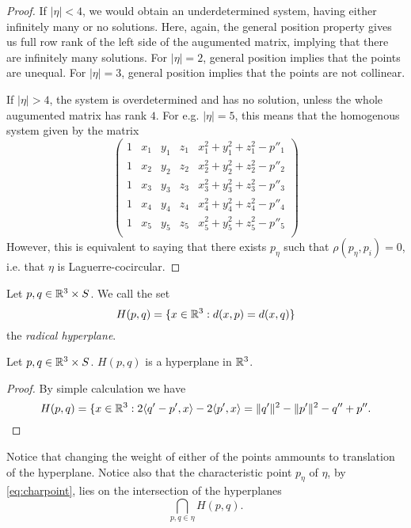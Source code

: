 \begin{proof}
	If $|\eta|<4$, we would obtain an underdetermined system, having either infinitely many or no solutions.  Here, again, the general position property gives us full row rank of the left side of the augumented matrix, implying that there are infinitely many solutions. For $|\eta|=2$, general position implies that the points are unequal. For $|\eta| =3$, general position implies that the points are not collinear.


	If $|\eta|>4$, the system is overdetermined and has no solution, unless the whole augumented matrix has rank $4$. For e.g. $|\eta|=5$, this means that the homogenous system given by the matrix 
	$$
	\begin{pmatrix}\label{circmat}
		1 & x_1 & y_1 & z_1 & x_1^2 + y_1^2 + z_1^2 - p''_1  \\
		1 & x_2 & y_2 & z_2 & x_2^2 + y_2^2 + z_2^2 - p''_2  \\
		1 & x_3 & y_3 & z_3 & x_3^2 + y_3^2 + z_3^2 - p''_3  \\
		1 & x_4 & y_4 & z_4 & x_4^2 + y_4^2 + z_4^2 - p''_4  \\
		1 & x_5 & y_5 & z_5 & x_5^2 + y_5^2 + z_5^2 - p''_5  \\
	\end{pmatrix}
	$$
	However, this is equivalent to saying that there exists $p_\eta$ such that $\rho(p_\eta,p_i)=0$, i.e. that $\eta$ is Laguerre-cocircular.
\end{proof}

\begin{definition} Let $p,q \in {\mathbb R^3}\times S$. We call the set 
	$$H(p,q) = \{ x\in {\mathbb R^3}: d(x,p) = d(x,q) \}$$
	the \textit{radical hyperplane}.
\end{definition}

\begin{proposition} Let $p,q \in {\mathbb R^3}\times S$. $H(p,q)$ is a hyperplane in ${\mathbb R^3}$.
\end{proposition}
\begin{proof}
	By simple calculation we have
	$$H(p,q) = \{x \in {\mathbb R^3}: 2 \langle q'-p',x \rangle  - 2\langle p', x \rangle  = \|q'\|^2 - \|p'\|^2  - q'' + p''.$$
\end{proof}

Notice that changing the weight of either of the points ammounts to translation of the hyperplane. Notice also that the characteristic point $p_\eta$ of $\eta$, by \ref{eq:charpoint}, lies on the intersection of the hyperplanes
$$\bigcap_{p,q\in\eta} H(p,q).$$


